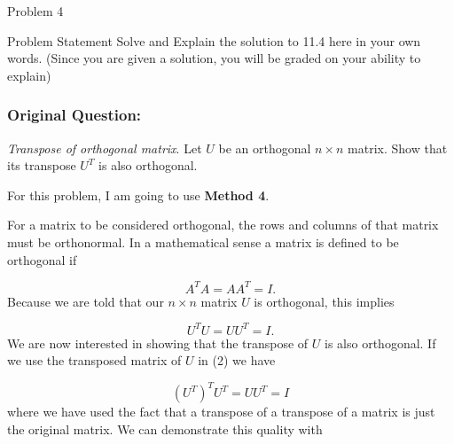\begin{problem}{Problem 4}
    \begin{statement}{Problem Statement}
        Solve and Explain the solution to 11.4 here in your own words. (Since you are given a solution, you will be graded on your ability to explain)

        \subsubsection*{Original Question:}

        \textit{Transpose of orthogonal matrix}. Let $U$ be an orthogonal $n \times n$ matrix. Show that its transpose $U^{T}$ is also orthogonal.
    \end{statement}
    \begin{Highlight}[Solution]
        \noindent For this problem, I am going to use \textbf{Method 4}. \vspace*{1em}

        For a matrix to be considered orthogonal, the rows and columns of that matrix must be orthonormal. In a mathematical sense a matrix is defined to be orthogonal if

        \setcounter{equation}{0}
        \begin{equation}
            A^{T}A = AA^{T} = I.
        \end{equation}
        Because we are told that our $n \times n$ matrix $U$ is orthogonal, this implies

        \begin{equation}
            U^{T}U = UU^{T} = I.
        \end{equation}
        We are now interested in showing that the transpose of $U$ is also orthogonal. If we use the transposed matrix of $U$ in (2) we have

        \begin{equation}
            (U^{T})^{T}U^{T} = UU^{T} = I
        \end{equation}
        where we have used the fact that a transpose of a transpose of a matrix is just the original matrix. We can demonstrate this quality with


\end{Highlight}
\end{problem}
